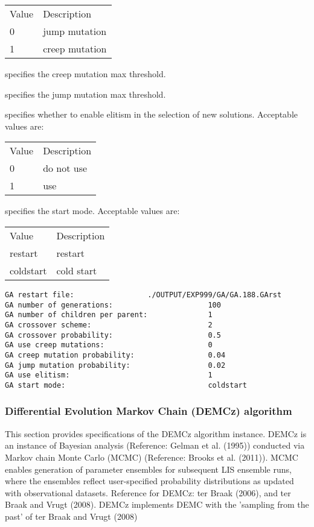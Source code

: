  \begin{tabular}{ll}
 Value & Description    \\
 0     & jump mutation  \\
 1     & creep mutation \\
 \end{tabular}

  specifies the 
 creep mutation max threshold.

  specifies the 
 jump mutation max threshold.

  specifies whether to enable
 elitism in the selection of new solutions.
 Acceptable values are:

 \begin{tabular}{ll}
 Value & Description \\
 0     & do not use  \\
 1     & use         \\
 \end{tabular}

  specifies the start mode.
 Acceptable values are:

 \begin{tabular}{ll}
 Value     & Description \\
 restart   & restart     \\
 coldstart & cold start  \\
 \end{tabular}
 

 \begin{Verbatim}[frame=single]
GA restart file:                 ./OUTPUT/EXP999/GA/GA.188.GArst
GA number of generations:                      100
GA number of children per parent:              1
GA crossover scheme:                           2
GA crossover probability:                      0.5
GA use creep mutations:                        0 
GA creep mutation probability:                 0.04
GA jump mutation probability:                  0.02
GA use elitism:                                1
GA start mode:                                 coldstart 
 \end{Verbatim}

 
 \subsubsection{Differential Evolution Markov Chain (DEMCz) algorithm} \label{ssec:demcz}
 This section provides specifications of the DEMCz algorithm instance.
 DEMCz is an instance of Bayesian analysis (Reference: Gelman et al. (1995)) conducted via 
 Markov chain Monte Carlo (MCMC) (Reference: Brooks et al. (2011)).
 MCMC enables generation of parameter ensembles for subsequent LIS ensemble runs,
 where the ensembles reflect user-specified probability distributions as updated with
 observational datasets.
 Reference for DEMCz: ter Braak (2006), and ter Braak and Vrugt (2008).
 DEMCz implements DEMC with the 'sampling from the past' of ter Braak and Vrugt (2008)
 

